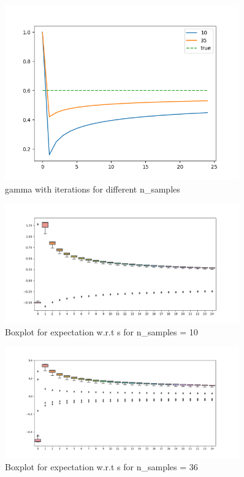 \begin{figure}[h] \label{fig:gamma}
\centering
\includegraphics[width=0.9\textwidth]{plots/gamma.png}
\caption{gamma with iterations for different n\_samples}
\end{figure}
\begin{figure}[h] \label{fig:es10}
  \centering
  \includegraphics[width=0.9\textwidth]{plots/box_e_s_10.png}
  \caption{Boxplot for expectation w.r.t s for n\_samples = 10}
\end{figure}
\begin{figure}[h] \label{fig:es35}
\centering
\includegraphics[width=0.9\textwidth]{plots/box_e_s_35.png}
\caption{Boxplot for expectation w.r.t s for n\_samples = 36}
\end{figure}
